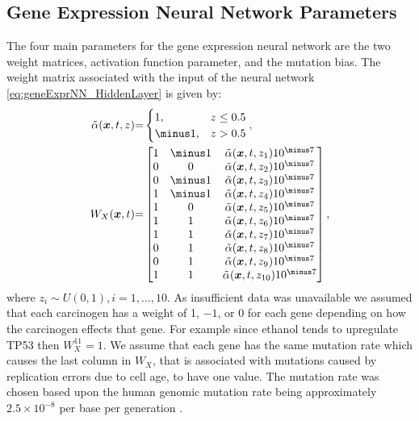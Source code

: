 \documentclass[\main/thesis.tex]{subfiles}
\begin{document}
\subsection{Gene Expression Neural Network Parameters}
The four main parameters for the gene expression neural network are the two weight matrices, activation function parameter, and the mutation bias. The weight matrix associated with the input of the neural network \eqref{eq:geneExprNN_HiddenLayer} is given by:
\begin{align}
\Tilde{\alpha}(\boldsymbol{x}, t, z) &{=}
\begin{cases}
  1, &z \le 0.5\\
  \minus 1, &z > 0.5
\end{cases},\\
W_X(\boldsymbol{x}, t) &{=}
\begin{bmatrix}
	1 & \minus 1 & \Tilde{\alpha}(\boldsymbol{x}, t, z_1) 10^{\minus 7} \\
	0 & 0 & \Tilde{\alpha}(\boldsymbol{x}, t, z_2) 10^{\minus 7} \\
	0 & \minus 1 & \Tilde{\alpha}(\boldsymbol{x}, t, z_3) 10^{\minus 7} \\
	1 & \minus 1 & \Tilde{\alpha}(\boldsymbol{x}, t, z_4) 10^{\minus 7} \\
	1 & 0 & \Tilde{\alpha}(\boldsymbol{x}, t, z_5) 10^{\minus 7} \\
	1 & 1 & \Tilde{\alpha}(\boldsymbol{x}, t, z_6) 10^{\minus 7} \\
	1 & 1 & \Tilde{\alpha}(\boldsymbol{x}, t, z_7) 10^{\minus 7} \\
	0 & 1 & \Tilde{\alpha}(\boldsymbol{x}, t, z_8) 10^{\minus 7} \\
	0 & 1 & \Tilde{\alpha}(\boldsymbol{x}, t, z_9) 10^{\minus 7} \\
	1 & 1 & \Tilde{\alpha}(\boldsymbol{x}, t, z_{10}) 10^{\minus 7} \\	
\end{bmatrix},
\label{param:Wx}
\end{align}
where $z_i {\sim} U(0, 1), i{=}1, ..., 10$.  
As insufficient data was unavailable we assumed that each carcinogen has a weight of 1, $\minus 1$, or 0 for each gene depending on how the carcinogen effects that gene. For example since ethanol tends to upregulate TP53 then $W_X^{11} {=} 1$.
We assume that each gene has the same mutation rate which causes the last column in $W_X$, that is associated with mutations caused by replication errors due to cell age, to have one value. The mutation rate was chosen based upon the human genomic mutation rate being approximately $2.5{\times}10^{\minus 8}$ per base per generation \cite{Nachman}. 
\end{document}
